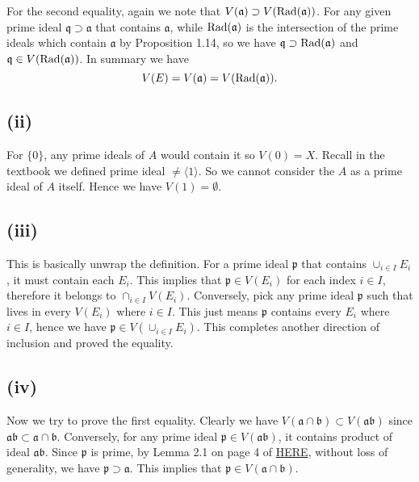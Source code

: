 \noindent For the second equality, again we note that $V(\mathfrak a)\supset V(\operatorname{Rad}(\mathfrak a))$. For any given prime ideal $\mathfrak q\supset \mathfrak a$ that contains $\mathfrak a$, while $\operatorname{Rad}(\mathfrak a)$ is the intersection of the prime ideals which contain $\mathfrak a$ by Proposition 1.14, so we have $\mathfrak q\supset \operatorname{Rad}(\mathfrak a)$ and $\mathfrak q\in V(\operatorname{Rad}(\mathfrak a))$. In summary we have 
$$V(E)=V(\mathfrak a)=V(\operatorname{Rad}(\mathfrak a)).$$

\subsection{(ii)} For $\{0\}$, any prime ideals of $A$ would contain it so $V(0)=X$. Recall in the textbook we defined prime ideal $\neq \langle 1\rangle$. So we cannot consider the $A$ as a prime ideal of $A$ itself. Hence we have $V(1)=\emptyset$.\\

\subsection{(iii)} This is basically unwrap the definition. For a prime ideal $\mathfrak p$ that contains $\cup_{i\in I} E_i$, it must contain each $E_i$. This implies that $\mathfrak p\in V(E_i)$ for each index $i\in I$, therefore it belongs to $\cap _{i\in I} V(E_i)$. Conversely, pick any prime ideal $\mathfrak p$ such that lives in every $V(E_i)$ where $i\in I$. This just means $\mathfrak p$ contains every $E_i$ where $i\in I$, hence we have $\mathfrak p\in V(\cup_{i\in I} E_i)$. This completes another direction of inclusion and proved the equality.\\

\subsection{(iv)} Now we try to prove the first equality. Clearly we have $V(\mathfrak a \cap \mathfrak b)\subset V(\mathfrak a\mathfrak b)$ since $\mathfrak a\mathfrak b\subset \mathfrak a\cap \mathfrak b$. Conversely, for any prime ideal $\mathfrak p\in V(\mathfrak a\mathfrak b)$, it contains product of ideal $\mathfrak a\mathfrak b$. Since $\mathfrak p$ is prime, by Lemma 2.1 on page 4 of \href{https://www.jmilne.org/math/xnotes/CA.pdf}{HERE}, without loss of generality, we have $\mathfrak p\supset \mathfrak a$. This implies that $\mathfrak p\in V(\mathfrak a\cap\mathfrak b)$.\\

